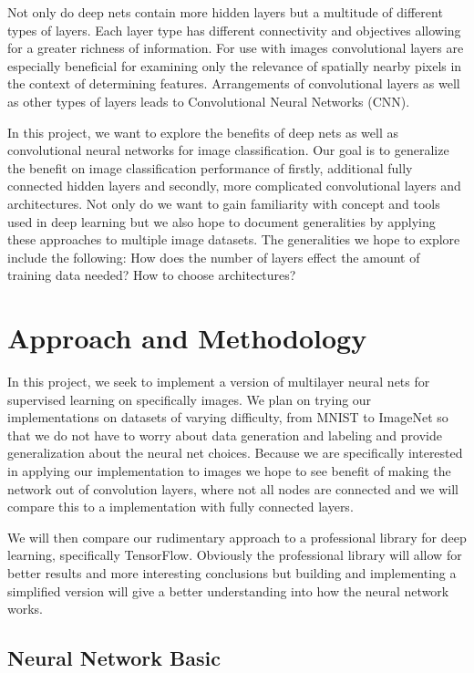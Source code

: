 \documentclass[12pt, twocolumn]{article}
\begin{document}
Not only do deep nets contain more hidden layers but a multitude of different types of layers. Each layer type has different connectivity and objectives allowing for a greater richness of information. For use with images convolutional layers are especially beneficial for examining only the relevance of spatially nearby pixels in the context of determining features. Arrangements of convolutional layers as well as other types of layers leads to Convolutional Neural Networks (CNN). 

In this project, we want to explore the benefits of deep nets as well as convolutional neural networks for image classification.  Our goal is to generalize the benefit on image classification performance of firstly, additional fully connected hidden layers and secondly, more complicated convolutional layers and architectures. Not only do we want to gain familiarity with concept and tools used in deep learning but we also hope to document generalities by applying these approaches to multiple image datasets. The generalities we hope to explore include the following: How does the number of layers effect the amount of training data needed? How to choose architectures? 

\section{Approach and Methodology}
	
In this project, we seek to implement a version of multilayer neural nets for supervised learning on specifically images. We plan on trying our implementations on datasets of varying difficulty, from MNIST to ImageNet so that we do not have to worry about data generation and labeling and provide generalization about the neural net choices. Because we are specifically interested in applying our implementation to images we hope to see benefit of making the network out of convolution layers, where not all nodes are connected and we will compare this to a implementation with fully connected layers.

 We will then compare our rudimentary approach to a professional library for deep learning, specifically TensorFlow. Obviously the professional library will allow for better results and more interesting conclusions but building and implementing a simplified version will give a better understanding into how the neural network works. 

\subsection{Neural Network Basic}
\end{document}
